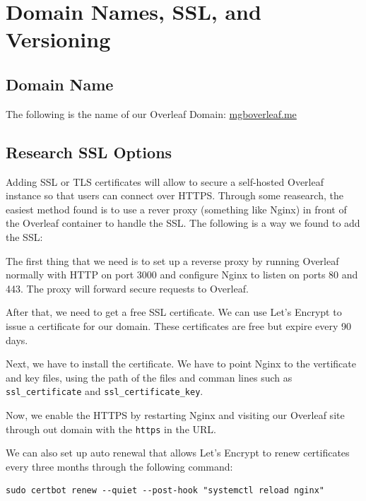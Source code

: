 \chapter{Domain Names, SSL, and Versioning\\
}

\section{Domain Name}
The following is the name of our Overleaf Domain:
\href{https://mgboverleaf.me}{mgboverleaf.me}

\section{Research SSL Options}
Adding SSL or TLS certificates will allow to secure a self-hosted Overleaf instance so that users can connect over HTTPS. Through some reasearch, the easiest method found is to use a rever proxy (something like Nginx) in front of the Overleaf container to handle the SSL. The following is a way we found to add the SSL:

The first thing that we need is to set up a reverse proxy by running Overleaf normally with HTTP on port 3000 and configure Nginx to listen on ports 80 and 443. The proxy will forward secure requests to Overleaf.

After that, we need to get a free SSL certificate. We can use Let's Encrypt to issue a certificate for our domain. These certificates are free but expire every 90 days.

Next, we have to install the certificate. We have to point Nginx to the vertificate and key files, using the path of the files and comman lines such as \texttt{ssl\_certificate} and \texttt{ssl\_certificate\_key}.

Now, we enable the HTTPS by restarting Nginx and visiting our Overleaf site through out domain with the \texttt{https} in the URL.

We can also set up auto renewal that allows Let's Encrypt to renew certificates every three months through the following command:

\begin{verbatim}
sudo certbot renew --quiet --post-hook "systemctl reload nginx"
\end{verbatim}

